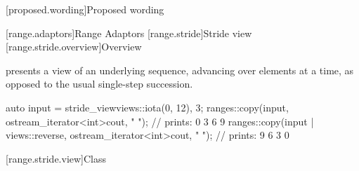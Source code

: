 [proposed.wording]{Proposed wording}

[range.adaptors]{Range Adaptors}
[range.stride]{Stride view}
[range.stride.overview]{Overview}

\pnum
{} presents a view of an underlying sequence, advancing over  elements at
a time, as opposed to the usual single-step succession.

\pnum
\begin{example}
\begin{codeblock}
auto input = stride_view{views::iota(0, 12), 3};
ranges::copy(input, ostream_iterator<int>{cout, " "}); // prints: 0 3 6 9
ranges::copy(input | views::reverse, ostream_iterator<int>{cout, " "}); // prints: 9 6 3 0
\end{codeblock}
\end{example}

[range.stride.view]{Class }

